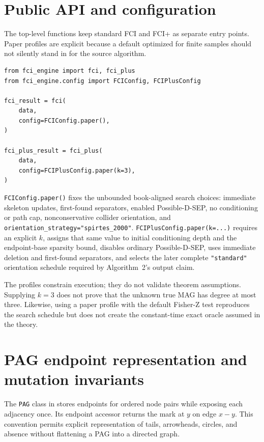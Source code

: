 \documentclass[11pt,a4paper,oneside]{report}
\newcommand{\code}[1]{\texttt{#1}}
\begin{document}
\section{Public API and configuration}

The top-level functions keep standard FCI and FCI+ as separate entry points.
Paper profiles are explicit because a default optimized for finite samples
should not silently stand in for the source algorithm.

\begin{lstlisting}[style=python,
caption={Paper-aligned entry points remain distinct.}]
from fci_engine import fci, fci_plus
from fci_engine.config import FCIConfig, FCIPlusConfig

fci_result = fci(
    data,
    config=FCIConfig.paper(),
)

fci_plus_result = fci_plus(
    data,
    config=FCIPlusConfig.paper(k=3),
)
\end{lstlisting}

\code{FCIConfig.paper()} fixes the unbounded book-aligned search choices:
immediate skeleton updates, first-found separators, enabled
Possible-D-SEP, no conditioning or path cap, nonconservative collider
orientation, and \code{orientation\_strategy="spirtes\_2000"}.
\code{FCIPlusConfig.paper(k=...)} requires an explicit \(k\), assigns that
same value to initial conditioning depth and the endpoint-base sparsity bound,
disables ordinary Possible-D-SEP, uses immediate deletion and first-found
separators, and selects the later complete \code{"standard"} orientation
schedule required by Algorithm~2's output claim.

The profiles constrain execution; they do not validate theorem assumptions.
Supplying \(k=3\) does not prove that the unknown true MAG has degree at most
three.  Likewise, using a paper profile with the default Fisher-Z test
reproduces the search schedule but does not create the constant-time exact
oracle assumed in the theory.

\section{PAG endpoint representation and mutation invariants}

The \code{PAG} class in  stores endpoints for ordered node
pairs while exposing each adjacency once.  Its endpoint accessor returns the
mark at \(y\) on edge \(x-y\).  This convention permits explicit
representation of tails, arrowheads, circles, and absence without flattening
a PAG into a directed graph.
\end{document}
